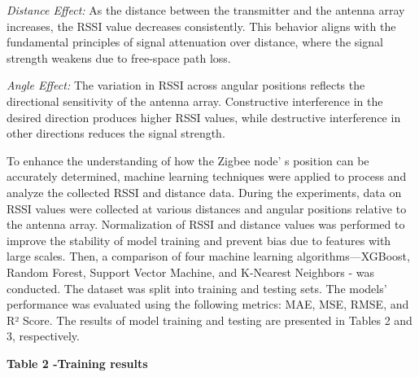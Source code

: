 \begin{multicols}{2}
\emph{Distance Effect:} As the distance between the transmitter and the
antenna array increases, the RSSI value decreases consistently. This
behavior aligns with the fundamental principles of signal attenuation
over distance, where the signal strength weakens due to free-space path
loss.

\emph{Angle Effect:} The variation in RSSI across angular positions
reflects the directional sensitivity of the antenna array. Constructive
interference in the desired direction produces higher RSSI values, while
destructive interference in other directions reduces the signal
strength.

To enhance the understanding of how the Zigbee node' s
position can be accurately determined, machine learning techniques were
applied to process and analyze the collected RSSI and distance data.
During the experiments, data on RSSI values were collected at various
distances and angular positions relative to the antenna array.
Normalization of RSSI and distance values was performed to improve the
stability of model training and prevent bias due to features with large
scales. Then, a comparison of four machine learning
algorithms---XGBoost, Random Forest, Support Vector Machine, and
K-Nearest Neighbors - was conducted. The dataset was split into training
and testing sets. The models'{} performance was evaluated
using the following metrics: MAE, MSE, RMSE, and R² Score. The results
of model training and testing are presented in Tables 2 and 3,
respectively.
\end{multicols}

{\bfseries Table 2 -Training results}



